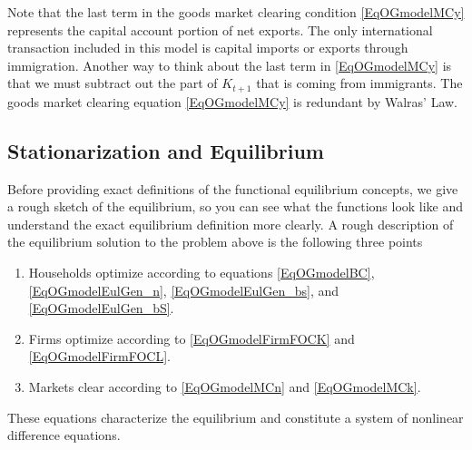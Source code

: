 \documentclass[letterpaper,12pt]{article}
\theoremstyle{definition}
\begin{document}
    Note that the last term in the goods market clearing condition \eqref{EqOGmodelMCy} represents the capital account portion of net exports. The only international transaction included in this model is capital imports or exports through immigration. Another way to think about the last term in \eqref{EqOGmodelMCy} is that we must subtract out the part of $K_{t+1}$ that is coming from immigrants. The goods market clearing equation \eqref{EqOGmodelMCy} is redundant by Walras' Law.


  \subsection{Stationarization and Equilibrium}\label{SecOGmodelStatEqlb}

    Before providing exact definitions of the functional equilibrium concepts, we give a rough sketch of the equilibrium, so you can see what the functions look like and understand the exact equilibrium definition more clearly. A rough description of the equilibrium solution to the problem above is the following three points
    \begin{enumerate}
      \item Households optimize according to equations \eqref{EqOGmodelBC}, \eqref{EqOGmodelEulGen_n}, \eqref{EqOGmodelEulGen_bs}, and \eqref{EqOGmodelEulGen_bS}.
      \item Firms optimize according to \eqref{EqOGmodelFirmFOCK} and \eqref{EqOGmodelFirmFOCL}.
      \item Markets clear according to \eqref{EqOGmodelMCn} and \eqref{EqOGmodelMCk}.
    \end{enumerate}
    These equations characterize the equilibrium and constitute a system of nonlinear difference equations.
\end{document}
